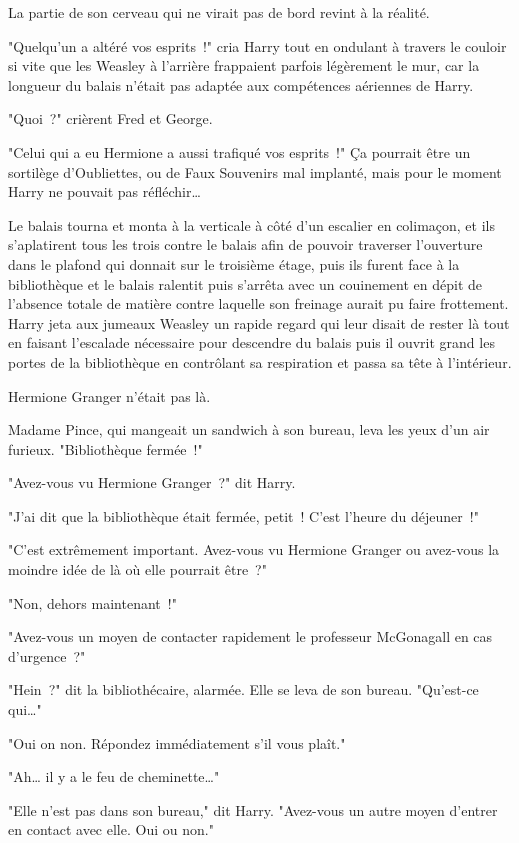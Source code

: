 La partie de son cerveau qui ne virait pas de bord revint à la réalité.

"Quelqu'un a altéré vos esprits~!" cria Harry tout en ondulant à travers le couloir si vite que les Weasley à l'arrière frappaient parfois légèrement le mur, car la longueur du balais n'était pas adaptée aux compétences aériennes de Harry.

"Quoi~?" crièrent Fred et George.

"Celui qui a eu Hermione a aussi trafiqué vos esprits~!" Ça pourrait être un sortilège d'Oubliettes, ou de Faux Souvenirs mal implanté, mais pour le moment Harry ne pouvait pas réfléchir…

Le balais tourna et monta à la verticale à côté d'un escalier en colimaçon, et ils s'aplatirent tous les trois contre le balais afin de pouvoir traverser l'ouverture dans le plafond qui donnait sur le troisième étage, puis ils furent face à la bibliothèque et le balais ralentit puis s'arrêta avec un couinement en dépit de l'absence totale de matière contre laquelle son freinage aurait pu faire frottement. Harry jeta aux jumeaux Weasley un rapide regard qui leur disait de rester là tout en faisant l'escalade nécessaire pour descendre du balais puis il ouvrit grand les portes de la bibliothèque en contrôlant sa respiration et passa sa tête à l'intérieur.

Hermione Granger n'était pas là.

Madame Pince, qui mangeait un sandwich à son bureau, leva les yeux d'un air furieux. "Bibliothèque fermée~!"

"Avez-vous vu Hermione Granger~?" dit Harry.

"J'ai dit que la bibliothèque était fermée, petit~! C'est l'heure du déjeuner~!"

"C'est extrêmement important. Avez-vous vu Hermione Granger ou avez-vous la moindre idée de là où elle pourrait être~?"

"Non, dehors maintenant~!"

"Avez-vous un moyen de contacter rapidement le professeur McGonagall en cas d'urgence~?"

"Hein~?" dit la bibliothécaire, alarmée. Elle se leva de son bureau. "Qu'est-ce qui…"

"Oui on non. Répondez immédiatement s'il vous plaît."

"Ah… il y a le feu de cheminette…"

"Elle n'est pas dans son bureau," dit Harry. "Avez-vous un autre moyen d'entrer en contact avec elle. Oui ou non."

